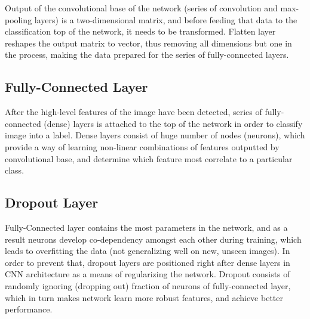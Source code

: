Output of the convolutional base of the network (series of convolution and max-pooling layers) is a two-dimensional matrix, and before feeding that data to the classification top of the network, it needs to be transformed. Flatten layer reshapes the output matrix to vector, thus removing all dimensions but one in the process, making the data prepared for the series of fully-connected layers.

\subsection{Fully-Connected Layer}

After the high-level features of the image have been detected, series of fully-connected (dense) layers is attached to the top of the network in order to classify image into a label. Dense layers consist of huge number of nodes (neurons), which provide a way of learning non-linear combinations of features outputted by convolutional base, and determine which feature most correlate to a particular class.

\subsection{Dropout Layer}

Fully-Connected layer contains the most parameters in the network, and as a result neurons develop co-dependency amongst each other during training, which leads to overfitting the data (not generalizing well on new, unseen images). In order to prevent that, dropout layers are positioned right after dense layers in CNN architecture as a means of regularizing the network. Dropout consists of randomly ignoring (dropping out) fraction of neurons of fully-connected layer, which in turn makes network learn more robust features, and achieve better performance.
\clearpage
